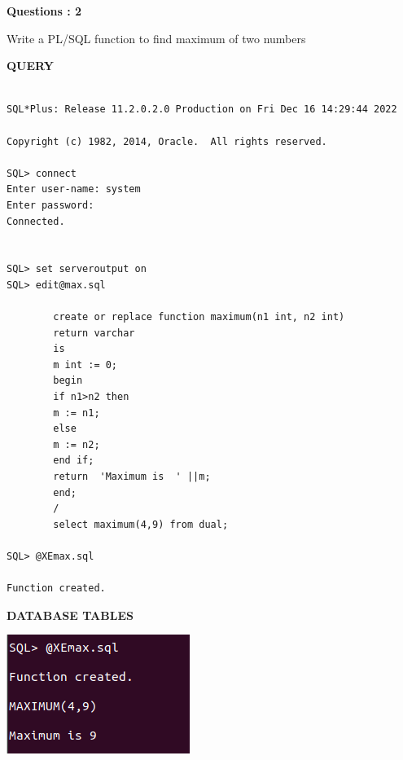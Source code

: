 \documentclass[a4paper,12pt]{report}
\begin{document}
\begin{flushleft}
    \textbf{Questions : 2}
\end{flushleft}
Write a PL/SQL function to find maximum of two numbers
	\begin{flushleft}
		\textbf{QUERY }
	\end{flushleft}
 \begin{verbatim}
 
SQL*Plus: Release 11.2.0.2.0 Production on Fri Dec 16 14:29:44 2022

Copyright (c) 1982, 2014, Oracle.  All rights reserved.

SQL> connect
Enter user-name: system
Enter password:
Connected.


SQL> set serveroutput on
SQL> edit@max.sql

		create or replace function maximum(n1 int, n2 int)
		return varchar
		is
		m int := 0;
		begin
		if n1>n2 then 
		m := n1;
		else
		m := n2;
		end if;
		return  'Maximum is  ' ||m;
		end;
		/
		select maximum(4,9) from dual;

SQL> @XEmax.sql

Function created.

\end{verbatim}
\begin{flushleft}
		\textbf{DATABASE TABLES} 
\end{flushleft} 

\includegraphics[scale=0.7]{MAXIMUM.png}
\end{document}
